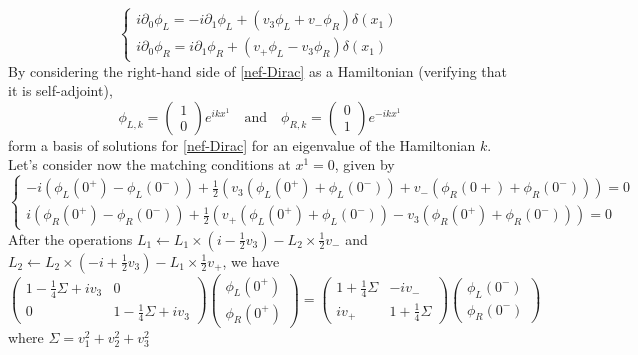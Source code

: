 \begin{equation}
\begin{cases}
i \partial_0 \phi_L = -i\partial_1 \phi_L + (v_3 \phi_L + v_- \phi_R) \delta(x_1) \\
i \partial_0 \phi_R = i\partial_1 \phi_R + (v_+ \phi_L - v_3 \phi_R) \delta(x_1)
\end{cases}
\end{equation}
By considering the right-hand side of \cref{nef-Dirac} as a Hamiltonian (verifying that it is self-adjoint), 
\begin{equation}\label{nef-basisSol}
\phi_{L,k} = 
\begin{pmatrix}
1 \\
0
\end{pmatrix} e^{ikx^1} \quad \textrm{and} \quad
\phi_{R,k} = 
\begin{pmatrix}
0 \\
1
\end{pmatrix} e^{-ikx^1}
\end{equation}
form a basis of solutions for \cref{nef-Dirac} for an eigenvalue of the Hamiltonian $k$.
Let's consider now the matching conditions at $x^1=0$, given by
\begin{equation}\label{nef-matching}
\begin{cases}
-i(\phi_L(0^+) - \phi_L(0^-)) + \frac{1}{2}(v_3 (\phi_L(0^+) + \phi_L(0^-))+ v_- (\phi_R(0+) + \phi_R(0^-))) = 0 \\
i(\phi_R(0^+) - \phi_R(0^-)) + \frac{1}{2}(v_+ (\phi_L(0^+) + \phi_L(0^-)) - v_3 (\phi_R(0^+) + \phi_R(0^-))) = 0
\end{cases}
\end{equation}
After the operations $L_1 \leftarrow L_1 \times (i - \frac{1}{2} v_3) - L_2 \times \frac{1}{2} v_-$ and $L_2 \leftarrow L_2 \times (-i + \frac{1}{2} v_3) - L_1 \times \frac{1}{2} v_+$, we have 
\begin{equation}
\begin{pmatrix}
1- \frac{1}{4}\Sigma + i v_3  & 0 \\
0  &  1- \frac{1}{4} \Sigma + i v_3 
\end{pmatrix}\begin{pmatrix}
\phi_L(0^+) \\
\phi_R(0^+)
\end{pmatrix} = \begin{pmatrix}
1+\frac{1}{4} \Sigma  & -iv_-  \\
iv_+  &  1+\frac{1}{4} \Sigma
\end{pmatrix}\begin{pmatrix}
\phi_L(0^-) \\
\phi_R(0^-)
\end{pmatrix}
\end{equation}
where $\Sigma = v_1 ^ 2 + v_2 ^ 2 + v_3 ^ 2$

